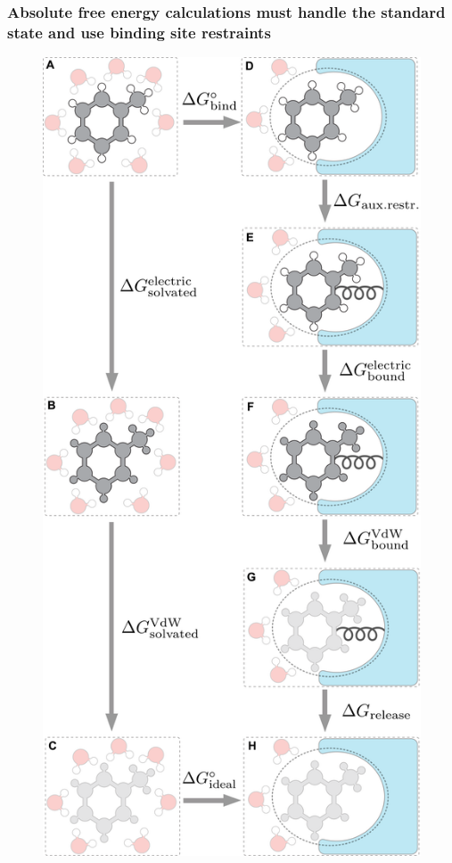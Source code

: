 \documentclass[9pt,bestpractices]{livecoms}
\begin{document}
\subsubsection{Absolute free energy calculations must handle the standard state and use binding site restraints}
\label{sec:standardstate-restraints}


\begin{figure}
    \includegraphics[width=0.95\linewidth]{figures/fig5_thermo_cyc_abs/Figure.png}

\end{figure}
\end{document}
